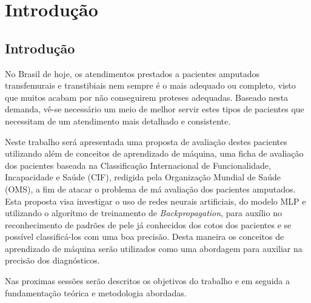 \part{Introdução}
\chapter[Introdução]{Introdução}

No Brasil de hoje, os atendimentos prestados a pacientes amputados transfemurais e transtibiais nem sempre é o mais adequado ou completo, visto que muitos acabam por não conseguirem proteses adequadas. Baseado nesta demanda, vê-se necessário um meio de melhor servir estes tipos de pacientes que necessitam de um atendimento mais detalhado e consistente.

Neste trabalho será apresentada uma proposta de avaliação destes pacientes  utilizando além de conceitos de aprendizado de máquina, uma ficha de avaliação dos pacientes baseada na Classificação Internacional de Funcionalidade, Incapacidade e Saúde (CIF), redigida pela Organização Mundial de Saúde (OMS), a fim de atacar o problema de má avaliação dos pacientes amputados. Esta proposta visa investigar o uso de redes neurais artificiais, do modelo MLP e utilizando o algorítmo de treinamento de \textit{Backpropagation}, para auxílio no reconhecimento de padrões de pele já conhecidos dos cotos dos pacientes e se possível classificá-los com uma boa precisão. Desta maneira os conceitos de aprendizado de máquina serão utilizados como uma abordagem para auxiliar na precisão dos diagnósticos.

Nas proximas sessões serão descritos os objetivos do trabalho e em seguida a fundamentação teórica e metodologia abordadas.
